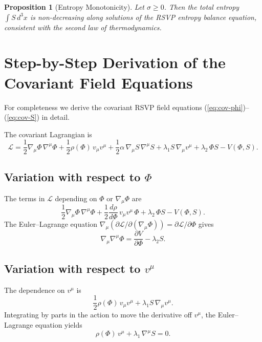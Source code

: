 \documentclass[12pt,a4paper]{article}
\theoremstyle{plain}
\newtheorem{proposition}{Proposition}
\theoremstyle{definition}
\theoremstyle{remark}
\begin{document}
\begin{proposition}[Entropy Monotonicity]
Let $\sigma \geq 0$. Then the total entropy $\int S\,d^3x$ is
non-decreasing along solutions of the RSVP entropy balance equation,
consistent with the second law of thermodynamics.
\end{proposition}

\section{Step-by-Step Derivation of the Covariant Field Equations}

For completeness we derive the covariant RSVP field equations
(\ref{eq:cov-phi})--(\ref{eq:cov-S}) in detail.

The covariant Lagrangian is
\begin{equation}
\mathcal{L} =
\frac{1}{2}\nabla_\mu\Phi\,\nabla^\mu\Phi
+ \frac{1}{2}\rho(\Phi)\,v_\mu v^\mu
+ \frac{1}{2}\alpha\,\nabla_\mu S\,\nabla^\mu S
+ \lambda_1 S\,\nabla_\mu v^\mu
+ \lambda_2\,\Phi S
- V(\Phi,S).
\end{equation}

\subsection*{Variation with respect to $\Phi$}

The terms in $\mathcal{L}$ depending on $\Phi$ or $\nabla_\mu\Phi$
are
\begin{equation}
\frac{1}{2}\nabla_\mu\Phi\,\nabla^\mu\Phi
+ \frac{1}{2}\frac{d\rho}{d\Phi}\,v_\mu v^\mu\,\Phi
+ \lambda_2\,\Phi S - V(\Phi,S).
\end{equation}
The Euler--Lagrange equation
$\nabla_\mu(\partial\mathcal{L}/\partial(\nabla_\mu\Phi))
= \partial\mathcal{L}/\partial\Phi$
gives
\begin{equation}
\nabla_\mu\nabla^\mu\Phi =
\frac{\partial V}{\partial\Phi} - \lambda_2 S.
\end{equation}

\subsection*{Variation with respect to $v^\mu$}

The dependence on $v^\mu$ is
\begin{equation}
\frac{1}{2}\rho(\Phi)\,v_\mu v^\mu + \lambda_1 S\,\nabla_\mu v^\mu.
\end{equation}
Integrating by parts in the action to move the derivative off $v^\mu$,
the Euler--Lagrange equation yields
\begin{equation}
\rho(\Phi)\,v^\mu + \lambda_1\,\nabla^\mu S = 0.
\end{equation}
\end{document}
